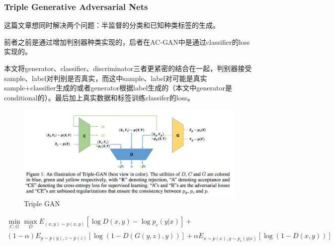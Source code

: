 \documentclass[a4paper]{article}
\begin{document}
\subsubsection{Triple Generative Adversarial Nets\cite{DBLP:journals/corr/LiXZZ17}}
这篇文章想同时解决两个问题：半监督的分类和已知种类标签的生成。

前者之前是通过增加判别器种类实现的，后者在AC-GAN中是通过classifier的loss实现的。

本文将generator、classifier、discriminator三者更紧密的结合在一起，判别器接受sample、label对判别是否真实，而这中sample、label对可能是真实sample+classifier生成的或者generator根据label生成的（本文中generator是conditional的）。最后加上真实数据和标签训练classifer的loss。
\begin{figure}
\centering
\includegraphics[width=\textwidth]{./img/32.png}
\caption{Triple GAN}
\label{fig:32}
\end{figure}
\begin{multline}
\min\limits_{C,G}\max\limits_D E_{(x,y)\sim p(x,y)}[\log D(x,y) - \log p_c(y|x)] +\\(1-\alpha)E_{y\sim p(y),z\sim p(z)}[\log(1-D(G(y,z), y))] + \alpha E_{x\sim p(x),y\sim p_c(y|x)}[\log (1 - D(x,y))]\nonumber
\end{multline}
\end{document}
